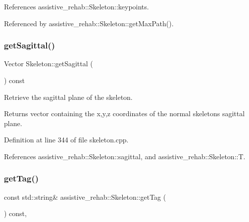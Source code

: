 References assistive\+\_\+rehab\+::\+Skeleton\+::keypoints.



Referenced by assistive\+\_\+rehab\+::\+Skeleton\+::get\+Max\+Path().

\mbox{\label{classassistive__rehab_1_1Skeleton_a83133fabc903ddd4e54edf59df977167}} 
\subsubsection{\texorpdfstring{getSagittal()}{getSagittal()}}
{\footnotesize\ttfamily Vector Skeleton\+::get\+Sagittal (\begin{DoxyParamCaption}{ }\end{DoxyParamCaption}) const\hspace{0.3cm}{\ttfamily [inherited]}}



Retrieve the sagittal plane of the skeleton. 

\begin{DoxyReturn}{Returns}
vector containing the x,y,z coordinates of the normal skeleton\textquotesingle{}s sagittal plane. 
\end{DoxyReturn}


Definition at line 344 of file skeleton.\+cpp.


\begin{DoxyCode}{0}

\end{DoxyCode}


References assistive\+\_\+rehab\+::\+Skeleton\+::sagittal, and assistive\+\_\+rehab\+::\+Skeleton\+::T.

\mbox{\label{classassistive__rehab_1_1Skeleton_a185654045d5e43b3853cdb8fdd676da6}} 
\subsubsection{\texorpdfstring{getTag()}{getTag()}}
{\footnotesize\ttfamily const std\+::string\& assistive\+\_\+rehab\+::\+Skeleton\+::get\+Tag (\begin{DoxyParamCaption}{ }\end{DoxyParamCaption}) const\hspace{0.3cm}{\ttfamily [inline]}, {\ttfamily [inherited]}}




